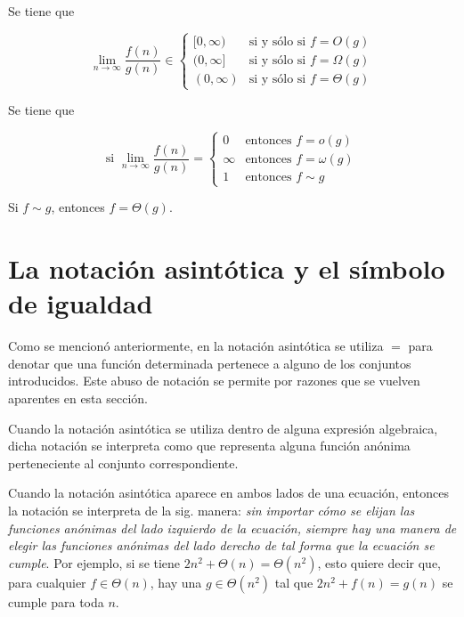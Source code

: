 \begin{prop}
    Se tiene que
    
    \[
        \lim_{n\to\infty}\dfrac{f(n)}{g(n)}\in\begin{cases}
            [0,\infty) & \text{si y sólo si }f=O(g)\\
            (0,\infty] & \text{si y sólo si }f=\Omega(g)\\
            (0,\infty) & \text{si y sólo si }f=\Theta(g)
        \end{cases}
    \]
\end{prop}

\begin{prop}
    Se tiene que

    \[
        \text{si }\lim_{n\to\infty}\dfrac{f(n)}{g(n)}=\begin{cases}
        0 & \text{entonces }f=o(g)\\
        \infty & \text{entonces }f=\omega(g)\\
        1 & \text{entonces }f\sim g
        \end{cases}
    \]
\end{prop}

\begin{prop}
    Si $f\sim g$, entonces $f=\Theta(g)$.
\end{prop}

\section{La notación asintótica y el símbolo de igualdad}

Como se mencionó anteriormente, en la notación asintótica se utiliza
$=$ para denotar que una función determinada pertenece a alguno de los conjuntos
introducidos. Este abuso de notación se permite por razones que se 
vuelven aparentes en esta sección.

Cuando la notación asintótica se utiliza dentro de alguna expresión algebraica, dicha 
notación se interpreta como que representa alguna función anónima perteneciente
al conjunto correspondiente.

Cuando la notación asintótica aparece en ambos lados de una ecuación, entonces
la notación se interpreta de la sig. manera: \emph{sin importar cómo se elijan las 
funciones anónimas del lado izquierdo de la ecuación, siempre hay una manera de elegir 
las funciones anónimas del lado derecho de tal forma que la ecuación se cumple}.
Por ejemplo, si se tiene $2n^2+\Theta(n)=\Theta(n^2)$, esto quiere decir que,
para cualquier $f\in\Theta(n)$, hay una $g\in\Theta(n^2)$ tal que $2n^2+f(n)=g(n)$ 
se cumple para toda $n$.

